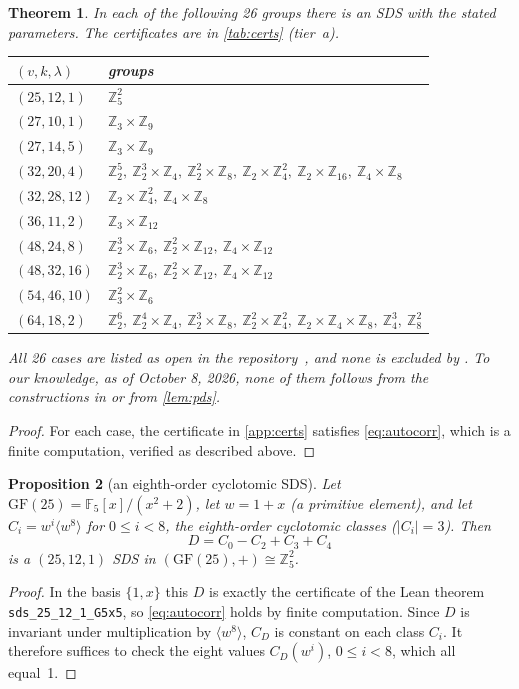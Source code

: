 \documentclass[11pt]{article}
\numberwithin{equation}{section}
\newtheorem{theorem}{Theorem}[section]
\newtheorem{proposition}[theorem]{Proposition}
\theoremstyle{definition}
\theoremstyle{remark}
\newcommand{\Z}{\mathbb Z}
\newcommand{\F}{\mathbb F}
\newcommand{\GF}{\mathrm{GF}}
\begin{document}
\begin{theorem}\label{thm:new}
In each of the following 26 groups there is an SDS with the stated parameters. The certificates
are in \cref{tab:certs} (tier~a).
\begin{center}
\begin{tabular}{ll}
\toprule
$(v,k,\lambda)$ & groups\\ \midrule
$(25,12,1)$ & $\Z_5^2$\\
$(27,10,1)$ & $\Z_3\times\Z_9$\\
$(27,14,5)$ & $\Z_3\times\Z_9$\\
$(32,20,4)$ & $\Z_2^5,\ \Z_2^3\times\Z_4,\ \Z_2^2\times\Z_8,\ \Z_2\times\Z_4^2,\ \Z_2\times\Z_{16},\ \Z_4\times\Z_8$\\
$(32,28,12)$ & $\Z_2\times\Z_4^2,\ \Z_4\times\Z_8$\\
$(36,11,2)$ & $\Z_3\times\Z_{12}$\\
$(48,24,8)$ & $\Z_2^3\times\Z_6,\ \Z_2^2\times\Z_{12},\ \Z_4\times\Z_{12}$\\
$(48,32,16)$ & $\Z_2^3\times\Z_6,\ \Z_2^2\times\Z_{12},\ \Z_4\times\Z_{12}$\\
$(54,46,10)$ & $\Z_3^2\times\Z_6$\\
$(64,18,2)$ & $\Z_2^6,\ \Z_2^4\times\Z_4,\ \Z_2^3\times\Z_8,\ \Z_2^2\times\Z_4^2,\ \Z_2\times\Z_4\times\Z_8,\ \Z_4^3,\ \Z_8^2$\\
\bottomrule
\end{tabular}
\end{center}
All 26 cases are listed as open in the repository~\cite{GordonSDSrepo}, and none is excluded by
\cite{HeWu2026}. To our knowledge, as of October 8, 2026, none of them follows from the
constructions in \cite{Gordon2023,HeChenGe2024,HeWu2026} or from \cref{lem:pds}.
\end{theorem}
\begin{proof}
For each case, the certificate in \cref{app:certs} satisfies \eqref{eq:autocorr}, which is a
finite computation, verified as described above.
\end{proof}

\begin{proposition}[an eighth-order cyclotomic SDS]\label{prop:cyc25}
Let $\GF(25)=\F_5[x]/(x^2+2)$, let $w=1+x$ (a primitive element), and let
$C_i=w^i\langle w^8\rangle$ for $0\le i<8$, the eighth-order cyclotomic classes ($|C_i|=3$). Then
\[
D=C_0-C_2+C_3+C_4
\]
is a $(25,12,1)$ SDS in $(\GF(25),+)\cong\Z_5^2$.
\end{proposition}
\begin{proof}
In the basis $\{1,x\}$ this $D$ is exactly the certificate of the Lean theorem
\texttt{sds\_25\_12\_1\_G5x5}, so \eqref{eq:autocorr} holds by finite computation. Since
$D$ is invariant under multiplication by $\langle w^8\rangle$, $C_D$ is constant on each class
$C_i$. It therefore suffices to check the eight values $C_D(w^i)$, $0\le i<8$, which all equal~1.
\end{proof}
\end{document}
